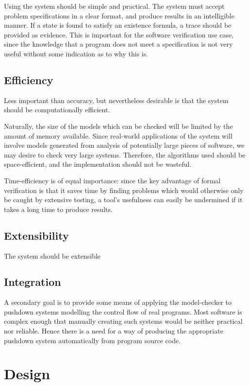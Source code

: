 \documentclass[11pt]{article}
\theoremstyle{definition}
\begin{document}
Using the system should be simple and practical.  The system must accept
problem specifications in a clear format, and produce results in an
intelligible manner.  If a state is found to satisfy an existence formula, a
trace should be provided as evidence.  This is important for the software
verification use case, since the knowledge that a program does not meet a
specification is not very useful without some indication as to why this is.

\subsection{Efficiency}

Less important than accuracy, but nevertheless desirable is that the system
should be computationally efficient. 

Naturally, the size of the models which can be checked will be limited by the
amount of memory available. Since real-world applications of the system will
involve models generated from analysis of potentially large pieces of software,
we may desire to check very large systems. Therefore, the algorithms used
should be space-efficient, and the implementation should not be wasteful.

Time-efficiency is of equal importance: since the key advantage of formal
verification is that it saves time by finding problems which would otherwise
only be caught by extensive testing, a tool's usefulness can easily be
undermined if it takes a long time to produce results.

\subsection{Extensibility}

The system should be extensible

\subsection{Integration}
A secondary goal is to provide some means of applying the model-checker to
pushdown systems modelling the control flow of real programs. Most software is
complex enough that manually creating such systems would be neither practical
nor reliable. Hence there is a need for a way of producing the appropriate
pushdown system automatically from program source code.


\section{Design}
\end{document}
